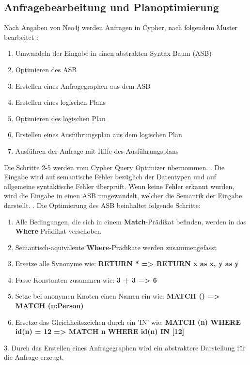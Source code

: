 \subsection{Anfragebearbeitung und Planoptimierung}
Nach Angaben von Neo4j werden Anfragen in Cypher, nach folgendem Muster bearbeitet \parencite{Optimizer}:
\begin{enumerate}
	\item Umwandeln der Eingabe in einen abstrakten Syntax Baum (ASB)
	\item Optimieren des ASB
	\item Erstellen eines Anfragegraphen aus dem ASB
	\item Erstellen eines logischen Plans
	\item Optimieren des logischen Plan 
	\item Erstellen eines Ausführungsplan aus dem logischen Plan
	\item Ausführen der Anfrage mit Hilfe des Ausführungsplans  
\end{enumerate}
Die Schritte 2-5 werden vom Cypher Query Optimizer übernommen. \newline {}. Die Eingabe wird auf semantische Fehler bezüglich der Datentypen und auf allgemeine syntaktische Fehler überprüft. Wenn keine Fehler erkannt wurden, wird die Eingabe in einen ASB umgewandelt, welcher die Semantik der Eingabe darstellt. \newline
{}. Die Optimierung des ASB beinhaltet folgende Schritte: 
\begin{enumerate}[label=(\roman*)]
	\item Alle Bedingungen, die sich in einem \textbf{Match}-Prädikat befinden, werden in das \textbf{Where}-Prädikat verschoben
	\item  Semantisch-äquivalente \textbf{Where}-Prädikate werden zusammengefasst
	\item Ersetze alle Synonyme wie: \textbf{RETURN * => RETURN x as x, y as y}
	\item Fasse Konstanten zusammen wie: \textbf{3 + 3 => 6}
	\item Setze bei anonymen Knoten einen Namen ein  wie: \textbf{ MATCH () => MATCH (n:Person)}
	\item Ersetze das Gleichheitszeichen durch ein 'IN' wie: \textbf{MATCH (n) WHERE id(n) = 12 => MATCH n WHERE id(n) IN [12]}
\end{enumerate}
3. Durch das Erstellen eines Anfragegraphen wird ein abstraktere Darstellung für die Anfrage erzeugt.\newline \newline
